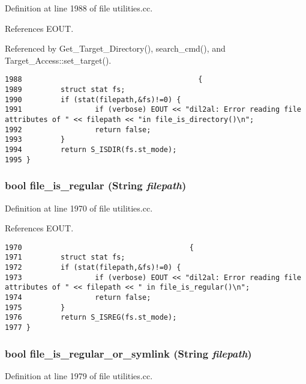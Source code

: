 Definition at line 1988 of file utilities.cc.

References EOUT.

Referenced by Get\_\-Target\_\-Directory(), search\_\-cmd(), and Target\_\-Access::set\_\-target().



\footnotesize\begin{verbatim}1988                                         {
1989         struct stat fs;
1990         if (stat(filepath,&fs)!=0) {
1991                 if (verbose) EOUT << "dil2al: Error reading file attributes of " << filepath << "in file_is_directory()\n";
1992                 return false;
1993         }
1994         return S_ISDIR(fs.st_mode);
1995 }
\end{verbatim}\normalsize 
{}
\subsubsection{\setlength{\rightskip}{0pt plus 5cm}bool file\_\-is\_\-regular ({\bf String} {\em filepath})}\label{dil2al_8hh_a230}




Definition at line 1970 of file utilities.cc.

References EOUT.



\footnotesize\begin{verbatim}1970                                       {
1971         struct stat fs;
1972         if (stat(filepath,&fs)!=0) {
1973                 if (verbose) EOUT << "dil2al: Error reading file attributes of " << filepath << " in file_is_regular()\n";
1974                 return false;
1975         }
1976         return S_ISREG(fs.st_mode);
1977 }
\end{verbatim}\normalsize 
{}
\subsubsection{\setlength{\rightskip}{0pt plus 5cm}bool file\_\-is\_\-regular\_\-or\_\-symlink ({\bf String} {\em filepath})}\label{dil2al_8hh_a231}




Definition at line 1979 of file utilities.cc.

